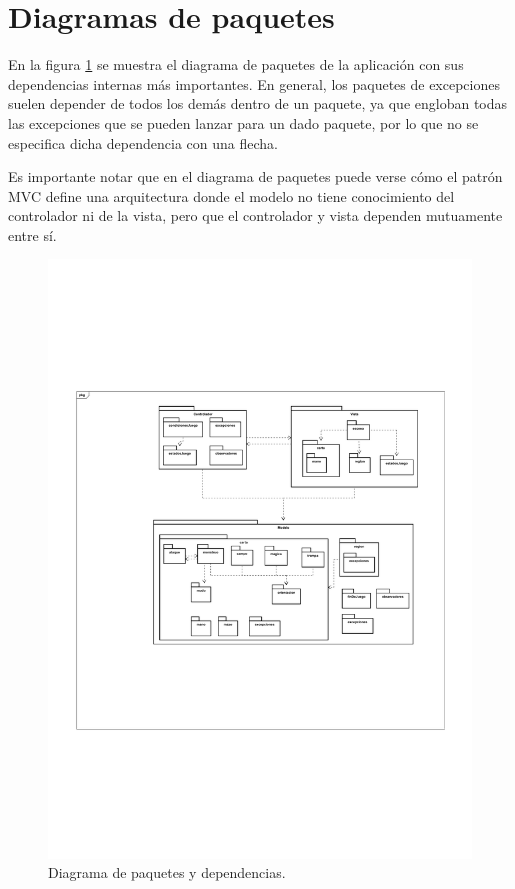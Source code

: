 	\section{Diagramas de paquetes}
	
	En la figura \ref{paquetes} se muestra el diagrama de paquetes de la aplicación con sus dependencias internas más importantes. En general, los paquetes de excepciones suelen depender de todos los demás dentro de un paquete, ya que engloban todas las excepciones que se pueden lanzar para un dado paquete, por lo que no se especifica dicha dependencia con una flecha.
	
	Es importante notar que en el diagrama de paquetes puede verse cómo el patrón MVC define una arquitectura donde el modelo no tiene conocimiento del controlador ni de la vista, pero que el controlador y vista dependen mutuamente entre sí.
	
	\begin{figure}[H]
		\centering
		\includegraphics[scale=1]{includes/paquetes}
		\caption{Diagrama de paquetes y dependencias.}
		\label{paquetes}
	\end{figure}
	
